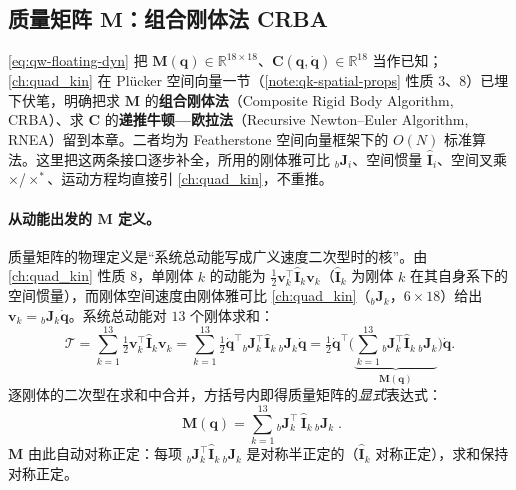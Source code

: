 \subsection{质量矩阵 \texorpdfstring{$\boldsymbol{M}$}{M}：组合刚体法 CRBA}
\label{subsec:qw-crba}

\cref{eq:qw-floating-dyn} 把 $\boldsymbol{M}(\boldsymbol{q})\in\mathbb{R}^{18\times18}$、$\boldsymbol{C}(\boldsymbol{q},\dot{\boldsymbol{q}})\in\mathbb{R}^{18}$ 当作已知；\cref{ch:quad_kin} 在 Plücker 空间向量一节（\cref{note:qk-spatial-props} 性质 3、8）已埋下伏笔，明确把求 $\boldsymbol{M}$ 的\textbf{组合刚体法}（Composite Rigid Body Algorithm, CRBA）、求 $\boldsymbol{C}$ 的\textbf{递推牛顿—欧拉法}（Recursive Newton--Euler Algorithm, RNEA）留到本章。二者均为 Featherstone 空间向量框架下的 $O(N)$ 标准算法\cite{featherstone2008rigid}。这里把这两条接口逐步补全，所用的刚体雅可比 ${}_{b}\boldsymbol{J}_i$、空间惯量 $\hat{\mathbf{I}}_i$、空间叉乘 $\times$/$\times^{*}$、运动方程均直接引 \cref{ch:quad_kin}，不重推。

\paragraph{从动能出发的 $\boldsymbol{M}$ 定义。}
质量矩阵的物理定义是“系统总动能写成广义速度二次型时的核”。由 \cref{ch:quad_kin} 性质 8，单刚体 $k$ 的动能为 $\tfrac12\boldsymbol{v}_k^\top\hat{\mathbf{I}}_k\boldsymbol{v}_k$（$\hat{\mathbf{I}}_k$ 为刚体 $k$ 在其自身系下的空间惯量），而刚体空间速度由刚体雅可比 \cref{ch:quad_kin}（${}_{b}\boldsymbol{J}_k$，$6\times18$）给出 $\boldsymbol{v}_k={}_{b}\boldsymbol{J}_k\dot{\boldsymbol{q}}$。系统总动能对 $13$ 个刚体求和：
\begin{equation}
  \mathcal{T}=\sum_{k=1}^{13}\tfrac12\boldsymbol{v}_k^\top\hat{\mathbf{I}}_k\boldsymbol{v}_k
  =\sum_{k=1}^{13}\tfrac12\dot{\boldsymbol{q}}^\top{}_{b}\boldsymbol{J}_k^\top\hat{\mathbf{I}}_k\,{}_{b}\boldsymbol{J}_k\dot{\boldsymbol{q}}
  =\tfrac12\dot{\boldsymbol{q}}^\top\Big(\underbrace{\sum_{k=1}^{13}{}_{b}\boldsymbol{J}_k^\top\hat{\mathbf{I}}_k\,{}_{b}\boldsymbol{J}_k}_{\boldsymbol{M}(\boldsymbol{q})}\Big)\dot{\boldsymbol{q}}.
  \label{eq:qw-M-energy}
\end{equation}
逐刚体的二次型在求和中合并，方括号内即得质量矩阵的\emph{显式}表达式：
\begin{equation}
  \boxed{\;\boldsymbol{M}(\boldsymbol{q})=\sum_{k=1}^{13}{}_{b}\boldsymbol{J}_k^\top\,\hat{\mathbf{I}}_k\,{}_{b}\boldsymbol{J}_k\;}.
  \label{eq:qw-M-sum}
\end{equation}
$\boldsymbol{M}$ 由此自动对称正定：每项 ${}_{b}\boldsymbol{J}_k^\top\hat{\mathbf{I}}_k\,{}_{b}\boldsymbol{J}_k$ 是对称半正定的（$\hat{\mathbf{I}}_k$ 对称正定），求和保持对称正定。

